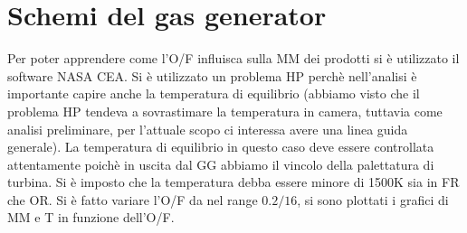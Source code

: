 \section{Schemi del gas generator}
\label{appendix:gg_schematics}

Per poter apprendere come l'O/F influisca sulla MM dei prodotti si è utilizzato il software NASA CEA. Si è utilizzato un problema HP perchè nell'analisi è importante capire anche la temperatura di equilibrio (abbiamo visto che il problema HP tendeva a sovrastimare la temperatura in camera, tuttavia come analisi preliminare, per l'attuale scopo ci interessa avere una linea guida generale). La temperatura di equilibrio in questo caso deve essere controllata attentamente poichè in uscita dal GG abbiamo il vincolo della palettatura di turbina. Si è imposto che la temperatura debba essere minore di 1500K sia in FR che OR. Si è fatto variare l'O/F da nel range $0.2 / 16$, si sono plottati i grafici di MM e T in funzione dell'O/F.